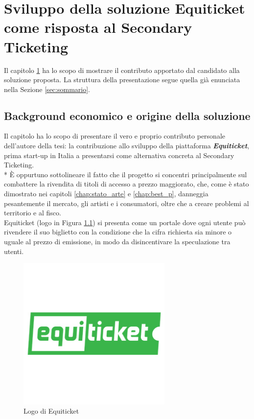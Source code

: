 \chapter{Sviluppo della soluzione Equiticket come risposta al Secondary Ticketing} \label{chap:equiticket}
Il capitolo \ref{chap:equiticket} ha lo scopo di mostrare il contributo apportato dal candidato alla soluzione proposta. La struttura della presentazione segue quella già enunciata nella Sezione \ref{sec:sommario}.
\label{chap:equiticket}
\section{Background economico e origine della soluzione} \label{sec:background}
Il capitolo ha lo scopo di presentare il vero e proprio contributo personale dell'autore della tesi: la contribuzione allo sviluppo della piattaforma \emph{\textbf{Equiticket}}, prima start-up in Italia a presentarsi come alternativa concreta al Secondary Ticketing. \\*
\`E oppurtuno sottolineare il fatto che il progetto si concentri principalmente sul combattere la rivendita di titoli di accesso a prezzo maggiorato, che, come è stato dimostrato nei capitoli \ref{chap:stato_arte} e \ref{chap:best_p}, danneggia pesantemente il mercato, gli artisti e i consumatori, oltre che a creare problemi al territorio e al fisco. \\
Equiticket (logo in Figura \ref{logoequi}) si presenta come un portale dove ogni utente può rivendere il suo biglietto con la condizione che la cifra richiesta sia minore o uguale al prezzo di emissione, in modo da disincentivare la speculazione tra utenti. 
\begin{figure}[htbp]
	\centering
	\includegraphics[width=0.68\textwidth]{chapter4/immagini/logo300}
	\caption{Logo di Equiticket}
	\label{logoequi}
\end{figure}
